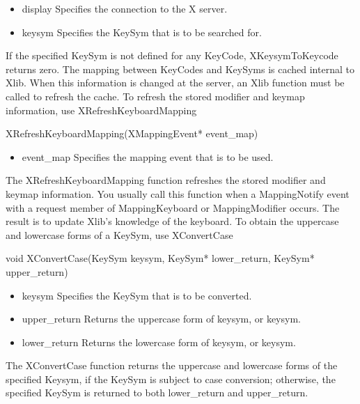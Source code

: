 \documentclass{report}
\begin{document}
\begin{itemize}
\begin{itemize}
\begin{cppcode}
            \end{cppcode}
            \begin{itemize}
                \item display Specifies the connection to the X server.
                \item keysym Specifies the KeySym that is to be searched for.
            \end{itemize}
            If the specified KeySym is not defined for any KeyCode, XKeysymToKeycode returns zero.
            \bigbreak \noindent 
            The mapping between KeyCodes and KeySyms is cached internal to Xlib. When this information is changed at the server, an Xlib function must be called to refresh the cache. To refresh the stored modifier and keymap information, use XRefreshKeyboardMapping
            \bigbreak \noindent 
            \begin{cppcode}
            XRefreshKeyboardMapping(XMappingEvent* event_map)
            \end{cppcode}
            \begin{itemize}
                \item event\_map Specifies the mapping event that is to be used.
            \end{itemize}
            The XRefreshKeyboardMapping function refreshes the stored modifier and keymap information. You usually call this function when a MappingNotify event with a request member of MappingKeyboard or MappingModifier occurs. The result is to update Xlib’s knowledge of the keyboard.
            \bigbreak \noindent 
            To obtain the uppercase and lowercase forms of a KeySym, use XConvertCase
            \bigbreak \noindent 
            \begin{cppcode}
                void XConvertCase(KeySym keysym, KeySym* lower_return, KeySym* upper_return)
            \end{cppcode}
            \begin{itemize}
                \item keysym Specifies the KeySym that is to be converted.
                \item upper\_return Returns the uppercase form of keysym, or keysym.
                \item lower\_return Returns the lowercase form of keysym, or keysym.
            \end{itemize}
            The XConvertCase function returns the uppercase and lowercase forms of the specified Keysym, if the KeySym is subject to case conversion; otherwise, the specified KeySym is returned to both lower\_return and upper\_return.

\end{itemize}
\end{itemize}
\end{document}
